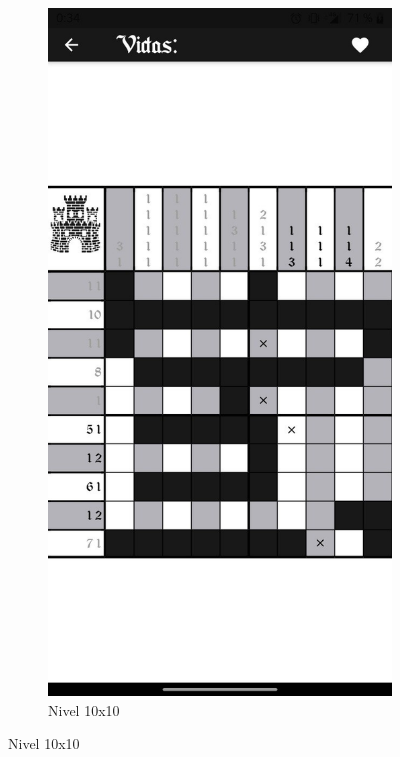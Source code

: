   \begin{figure}[H]
    \centering
    \begin{subfigure}[b]{0.45\linewidth}
      \includegraphics[width=\linewidth]{images/man6.jpeg}
      \caption{Nivel 10x10}
      \label{fig:man1-6}

\end{subfigure}
\end{figure}
